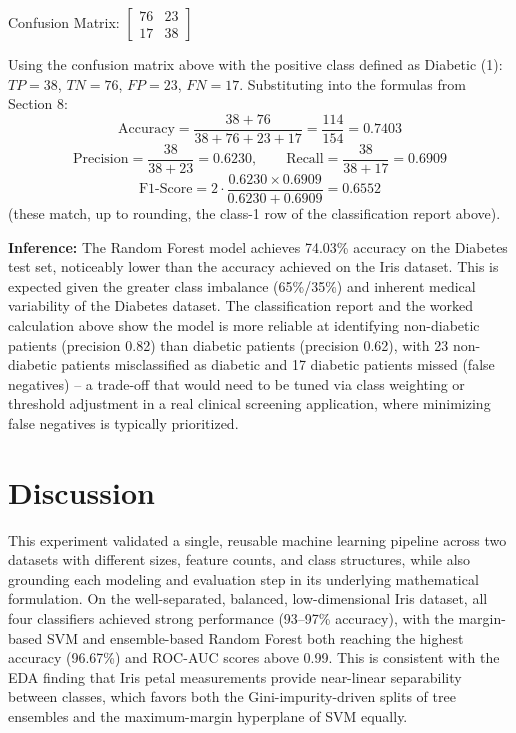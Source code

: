 \documentclass[12pt,a4paper]{article}
\begin{document}
Confusion Matrix: $\begin{bmatrix} 76 & 23 \\ 17 & 38 \end{bmatrix}$

Using the confusion matrix above with the positive class defined as Diabetic (1): $TP = 38$, $TN = 76$, $FP = 23$, $FN = 17$. Substituting into the formulas from Section 8:
\[
\text{Accuracy} = \frac{38+76}{38+76+23+17} = \frac{114}{154} = 0.7403
\]
\[
\text{Precision} = \frac{38}{38+23} = 0.6230, \qquad \text{Recall} = \frac{38}{38+17} = 0.6909
\]
\[
\text{F1-Score} = 2\cdot\frac{0.6230 \times 0.6909}{0.6230+0.6909} = 0.6552
\]
(these match, up to rounding, the class-1 row of the classification report above).

\textbf{Inference:} The Random Forest model achieves 74.03\% accuracy on the Diabetes test set, noticeably lower than the accuracy achieved on the Iris dataset. This is expected given the greater class imbalance (65\%/35\%) and inherent medical variability of the Diabetes dataset. The classification report and the worked calculation above show the model is more reliable at identifying non-diabetic patients (precision 0.82) than diabetic patients (precision 0.62), with 23 non-diabetic patients misclassified as diabetic and 17 diabetic patients missed (false negatives) -- a trade-off that would need to be tuned via class weighting or threshold adjustment in a real clinical screening application, where minimizing false negatives is typically prioritized.

\section{Discussion}

This experiment validated a single, reusable machine learning pipeline across two datasets with different sizes, feature counts, and class structures, while also grounding each modeling and evaluation step in its underlying mathematical formulation. On the well-separated, balanced, low-dimensional Iris dataset, all four classifiers achieved strong performance (93--97\% accuracy), with the margin-based SVM and ensemble-based Random Forest both reaching the highest accuracy (96.67\%) and ROC-AUC scores above 0.99. This is consistent with the EDA finding that Iris petal measurements provide near-linear separability between classes, which favors both the Gini-impurity-driven splits of tree ensembles and the maximum-margin hyperplane of SVM equally.
\end{document}
